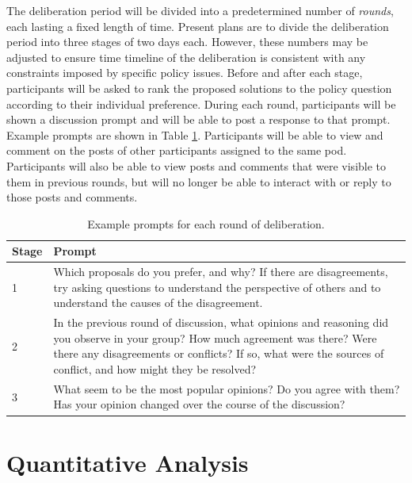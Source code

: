 The deliberation period will be divided into a predetermined number of {\em rounds},
each lasting a fixed length of time.
Present plans are to divide the deliberation period into three stages of two days
each.
However, these numbers may be adjusted to ensure time timeline of the
deliberation is consistent with any constraints imposed by specific policy issues.
Before and after each stage, participants will be asked to rank the proposed
solutions to the policy question according to their individual preference.
During each round, participants will be shown a discussion prompt and will be
able to post a response to that prompt.
Example prompts are shown in Table \ref{tab:prompts}.
Participants will be able to view and comment on the posts of other participants
assigned to the same pod.
Participants will also be able to view posts and comments that were visible to them
in previous rounds, but will no longer be able to interact with or reply to
those posts and comments.

\begin{table}
\center
\label{tab:prompts}
\begin{tabular}{|p{0.3in}|p{3.6in}|}
\hline
Stage & Prompt \\
\hline
1 &
Which proposals do you prefer, and why?
If there are disagreements, try asking questions to understand the perspective
of others and to understand the causes of the disagreement.
\\
\hline
2 & In the previous round of discussion, what opinions and reasoning did you
observe in your group?
How much agreement was there?
Were there any disagreements or conflicts?
If so, what were the sources of conflict, and how might they be resolved?
\\
\hline
3 &
What seem to be the most popular opinions?
Do you agree with them?
Has your opinion changed over the course of the discussion?
\\
\hline
\end{tabular}
\caption{Example prompts for each round of deliberation.}
\end{table}

\section{Quantitative Analysis}

